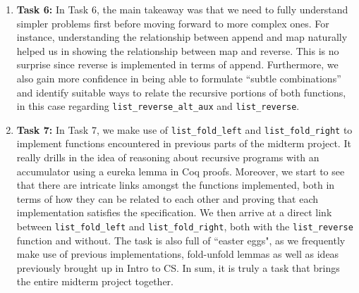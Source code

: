 \documentclass{article}
\begin{document}
\begin{enumerate}
  \item \textbf{Task 6:} In Task 6, the main takeaway was that we need to fully understand simpler problems first before moving forward to more complex ones. For instance, understanding the relationship between append and map naturally helped us in showing the relationship between map and reverse. This is no surprise since reverse is implemented in terms of append. Furthermore, we also gain more confidence in being able to formulate ``subtle combinations'' and identify suitable ways to relate the recursive portions of both functions, in this case regarding \texttt{list\_reverse\_alt\_aux} and \texttt{list\_reverse}.
  \item \textbf{Task 7:} In Task 7, we make use of \texttt{list\_fold\_left} and \texttt{list\_fold\_right} to implement functions encountered in previous parts of the midterm project. It really drills in the idea of reasoning about recursive programs with an accumulator using a eureka lemma in Coq proofs. Moreover, we start to see that there are intricate links amongst the functions implemented, both in terms of how they can be related to each other and proving that each implementation satisfies the specification. We then arrive at a direct link between \texttt{list\_fold\_left} and \texttt{list\_fold\_right}, both with the \texttt{list\_reverse} function and without. The task is also full of ``easter eggs", as we frequently make use of previous implementations, fold-unfold lemmas as well as ideas previously brought up in Intro to CS. In sum, it is truly a task that brings the entire midterm project together.  



  
\end{enumerate}
\end{document}
